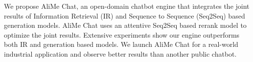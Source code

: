 We propose AliMe Chat, an open-domain chatbot engine that integrates the joint results of Information Retrieval (IR) and Sequence to Sequence (Seq2Seq) based generation models. AliMe Chat uses an attentive Seq2Seq based rerank model to optimize the joint results. Extensive experiments show our engine outperforms both IR and generation based models. We launch AliMe Chat for a real-world industrial application and observe better results than another public chatbot.
